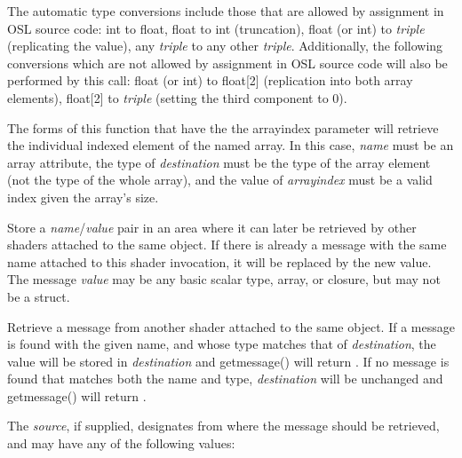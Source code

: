\documentclass[11pt,letterpaper]{book}
\begin{document}
The automatic type conversions include those that are allowed by
assignment in OSL source code: {\cf int} to {\cf float}, {\cf float} to
{\cf int} (truncation), {\cf float} (or {\cf int}) to \emph{triple}
(replicating the value), any \emph{triple} to any other \emph{triple}.
Additionally, the following conversions which are not allowed by
assignment in OSL source code will also be performed by this call: 
{\cf float} (or {\cf int}) to {\cf float[2]} (replication into both
array elements), {\cf float[2]} to \emph{triple} (setting the third
component to 0).

The forms of this function that have the the {\cf arrayindex} parameter
will retrieve the individual indexed element of the named array.  In this
case, \emph{name} must be an array attribute, the type of
\emph{destination} must be the type of the array element (not the type
of the whole array), and the value of \emph{arrayindex} must be a valid
index given the array's size.
\apiend

Store a \emph{name}/\emph{value} pair in an area where it can later be
retrieved by other shaders attached to the same object.  If there is
already a message with the same name attached to this shader invocation,
it will be replaced by the new value.
The message \emph{value} may be any basic scalar type, array, or closure,
but may not be a {\cf struct}.
\apiend

\label{sec:getmessage}

Retrieve a message from another shader attached to the same object.
If a message is found
with the given name, and whose type matches that of \emph{destination},
the value will be stored in \emph{destination} and {\cf getmessage()}
will return {}.  If no message is found that matches both the name
and type, \emph{destination} will be unchanged and {\cf getmessage()}
will return {}.

The \emph{source}, if supplied, designates from where the message should
be retrieved, and may have any of the following values:

\vspace{-8pt}
\end{document}

